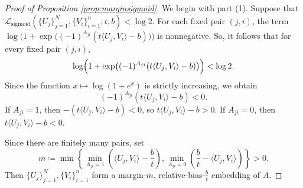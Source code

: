 \documentclass[preprint]{article}
\newcommand{\sigloss}{\mathcal{L}_{\text{sigmoid}}}
\begin{document}
\begin{proof}[Proof of Proposition \ref{prop:marginsigmoid}]

We begin with part (1). 
Suppose that $\sigloss(\{U_j\}_{j=1}^N,\{V_i\}_{i=1}^n;t,b)<\log 2$. For each fixed pair $(j,i)$, the term $\log\Big(1 + \exp\big((-1)^{A_{ji}}(t\langle U_j, V_i\rangle -b)\big)\Big)$ is nonnegative. So, it follows that for every fixed pair $(j,i),$
$$
\log\Bigl(1+\exp\bigl((-1)^{A_{ji}}(t\langle U_j,V_i\rangle-b)\bigr)\Bigr)<\log 2.
$$
Since the function $x\mapsto \log(1+e^x)$ is strictly increasing, we obtain
$$
(-1)^{A_{ji}}(t\langle U_j,V_i\rangle-b)<0.
$$
If $A_{ji}=1$, then $-(t\langle U_j,V_i\rangle-b)<0$, so $t\langle U_j,V_i\rangle-b>0.$ If $A_{ji}=0$, then $t\langle U_j,V_i\rangle-b<0.$

Since there are finitely many pairs, set
$$
m\coloneqq
\min\left\{
\min_{A_{ji}=1}\left(\langle U_j,V_i\rangle-\frac {b}{t}\right),
\min_{A_{ji}=0}\left(\frac {b}{t}-\langle U_j,V_i\rangle\right)
\right\}>0.
$$
Then $\{U_j\}_{j=1}^N,\{V_i\}_{i=1}^n$ form a margin-$m$, relative-bias-$\frac {b}{t}$ embedding of $A$.





\end{proof}
\end{document}
